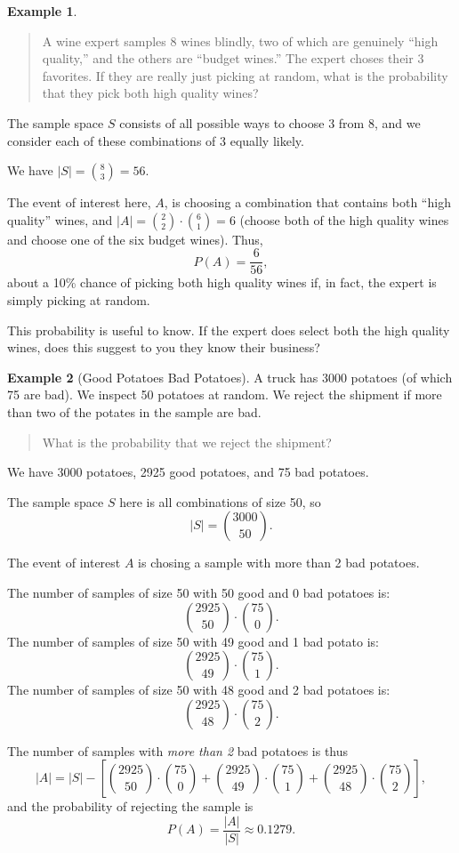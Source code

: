\documentclass[
]{book}
\theoremstyle{definition}
\theoremstyle{definition}
\newtheorem{example}{Example}[chapter]
\theoremstyle{definition}
\theoremstyle{definition}
\theoremstyle{remark}
\begin{document}
\begin{example}
\protect\hypertarget{exm:wine-expert}{}\label{exm:wine-expert}\leavevmode

\begin{quote}
A wine expert samples 8 wines blindly, two of which are genuinely ``high quality,'' and the others are ``budget wines.'' The expert choses their 3 favorites. If they are really just picking at random, what is the probability that they pick both high quality wines?
\end{quote}

The sample space \(S\) consists of all possible ways to choose 3 from 8, and we consider each of these combinations of 3 equally likely.

We have \(\displaystyle |S| = \binom{8}{3} = 56.\)

The event of interest here, \(A\), is choosing a combination that contains both ``high quality'' wines, and \(|A| = \displaystyle \binom{2}{2}\cdot\binom{6}{1} = 6\) (choose both of the high quality wines and choose one of the six budget wines). Thus,
\[P(A) = \frac{6}{56},\] about a 10\% chance of picking both high quality wines if, in fact, the expert is simply picking at random.

This probability is useful to know. If the expert does select both the high quality wines, does this suggest to you they know their business?

\end{example}

\begin{example}[Good Potatoes Bad Potatoes]
\protect\hypertarget{exm:potatoes}{}\label{exm:potatoes}A truck has 3000 potatoes (of which 75 are bad). We inspect 50 potatoes at random. We reject the shipment if more than two of the potates in the sample are bad.

\begin{quote}
What is the probability that we reject the shipment?
\end{quote}

We have 3000 potatoes, 2925 good potatoes, and 75 bad potatoes.

The sample space \(S\) here is all combinations of size 50, so \[|S| = \binom{3000}{50}.\]

The event of interest \(A\) is chosing a sample with more than 2 bad potatoes.

The number of samples of size 50 with 50 good and 0 bad potatoes is: \[\binom{2925}{50} \cdot \binom{75}{0}.\]
The number of samples of size 50 with 49 good and 1 bad potato is: \[\binom{2925}{49} \cdot \binom{75}{1}.\]
The number of samples of size 50 with 48 good and 2 bad potatoes is: \[\binom{2925}{48} \cdot \binom{75}{2}.\]

The number of samples with \emph{more than 2} bad potatoes is thus
\[|A| = |S| - \left[\binom{2925}{50} \cdot \binom{75}{0} +
\binom{2925}{49} \cdot \binom{75}{1} +
\binom{2925}{48} \cdot \binom{75}{2}\right],\]
and the probability of rejecting the sample is
\[P(A) = \frac{|A|}{|S|} \approx 0.1279.\]
\end{example}
\end{document}
